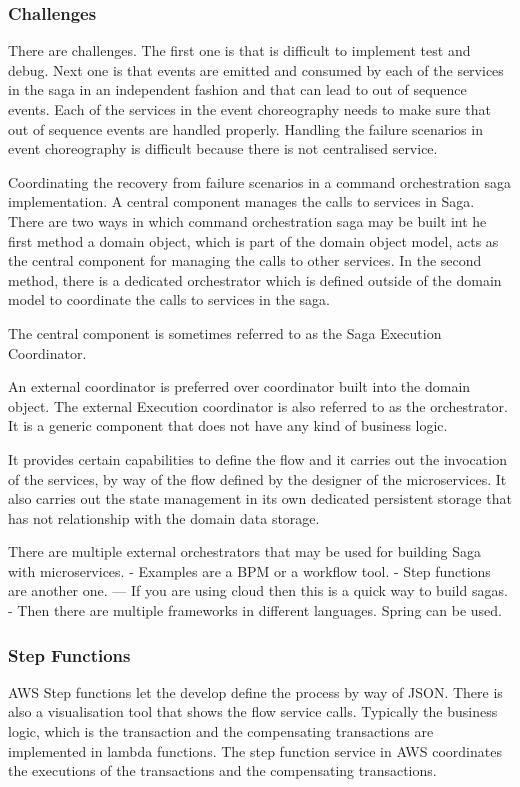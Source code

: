 \subsubsection{Challenges}
There are challenges.
The first one is that is difficult to implement test and debug.
Next one is that events are emitted and consumed by each of the services in the saga in an independent fashion and that can lead to out of sequence events.
Each of the services in the event choreography needs to make sure that out of sequence events are handled properly.
Handling the failure scenarios in event choreography is difficult because there is not centralised service.

Coordinating the recovery from failure scenarios in a command orchestration saga implementation.
A central component manages the calls to services in Saga.
There are two ways in which command orchestration saga may be built int he first method a domain object,
which is part of the domain object model, acts as the central component for managing the calls to other services.
In the second method, there is a dedicated orchestrator which is defined outside of the domain model to coordinate the calls to services in the saga.

The central component is sometimes referred to as the Saga Execution Coordinator.

An external coordinator is preferred over coordinator built into the domain object.
The external Execution coordinator is also referred to as the orchestrator.
It is a generic component that does not have any kind of business logic.

It provides certain capabilities to define the flow and it carries out the invocation of the services, by way of the flow defined by the designer of the microservices.
It also carries out the state management in its own dedicated persistent storage that has not relationship with the domain data storage.

There are multiple external orchestrators that may be used for building Saga with microservices.
- Examples are a BPM or a workflow tool.
- Step functions are another one.
--- If you are using cloud then this is a quick way to build sagas.
- Then there are multiple frameworks in different languages. Spring can be used.

\subsubsection{Step Functions}
AWS Step functions let the develop define the process by way of JSON.
There is also a visualisation tool that shows the flow service calls.
Typically the business logic, which is the transaction and the compensating transactions are implemented in lambda functions.
The step function service in AWS coordinates the executions of the transactions and the compensating transactions.

